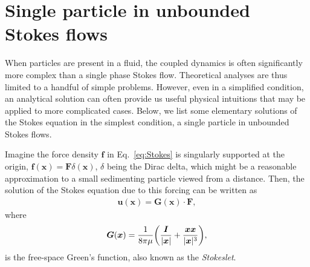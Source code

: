 \section{Single particle in unbounded Stokes flows}

When particles are present in a fluid, the coupled dynamics is often significantly more complex than a single phase Stokes flow. Theoretical analyses are thus limited to a handful of simple problems. However, even in a simplified condition, an analytical solution can often provide us useful physical intuitions that may be applied to more complicated cases. Below, we list some elementary solutions of the Stokes equation in the simplest condition, \ie a single particle in unbounded Stokes flows.

\bigskip
Imagine the force density ${\bm f}$ in Eq.\ \eqref{eq:Stokes} is singularly supported at the origin, \ie ${\bm f}({\bm x})={\bm F}\delta({\bm x})$, $\delta$ being the Dirac delta, which might be a reasonable approximation to a small sedimenting particle viewed from a distance. Then, the solution of the Stokes equation due to this forcing can be written as
\begin{equation} \label{eq:stokes-green}
 \begin{aligned}
   {\bm u}({\bm x}) = {\bm G}({\bm x}) \cdot {\bm F},
 \end{aligned}
\end{equation}
where  
\begin{equation}
 \begin{aligned}
   {\bm G}({\bm x}) = \frac{1}{8\pi\mu } \bigg( \frac{{\bm I}}{\lvert\bm x\rvert}+\frac{ {\bm x}{\bm x} }{ \lvert{\bm x}\rvert^3 } \bigg),
 \end{aligned}
\end{equation}
is the free-space Green's function, also known as the \emph{Stokeslet}.

